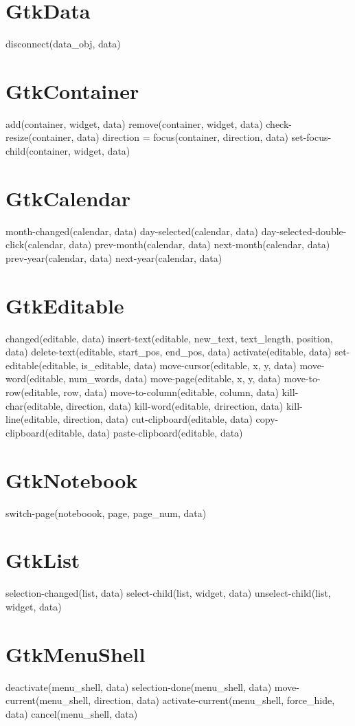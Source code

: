	\section{GtkData}
	disconnect(data_obj, data)

	\section{GtkContainer}
	add(container, widget, data)
	remove(container, widget, data)
	check-resize(container, data)
	direction = focus(container, direction, data)
	set-focus-child(container, widget, data)

	\section{GtkCalendar}
	month-changed(calendar, data)
	day-selected(calendar, data)
	day-selected-double-click(calendar, data)
	prev-month(calendar, data)
	next-month(calendar, data)
	prev-year(calendar, data)
	next-year(calendar, data)

	\section{GtkEditable}
	changed(editable, data)
	insert-text(editable, new_text, text_length, position, data)
	delete-text(editable, start_pos, end_pos, data)
	activate(editable, data)
	set-editable(editable, is_editable, data)
	move-cursor(editable, x, y, data)
	move-word(editable, num_words, data)
	move-page(editable, x, y, data)
	move-to-row(editable, row, data)
	move-to-column(editable, column, data)
	kill-char(editable, direction, data)
	kill-word(editable, drirection, data)
	kill-line(editable, direction, data)
	cut-clipboard(editable, data)
	copy-clipboard(editable, data)
	paste-clipboard(editable, data)

	\section{GtkNotebook}
	switch-page(noteboook, page, page_num, data)

	\section{GtkList}
	selection-changed(list, data)
	select-child(list, widget, data)
	unselect-child(list, widget, data)

	\section{GtkMenuShell}
	deactivate(menu_shell, data)
	selection-done(menu_shell, data)
	move-current(menu_shell, direction, data)
	activate-current(menu_shell, force_hide, data)
	cancel(menu_shell, data)

